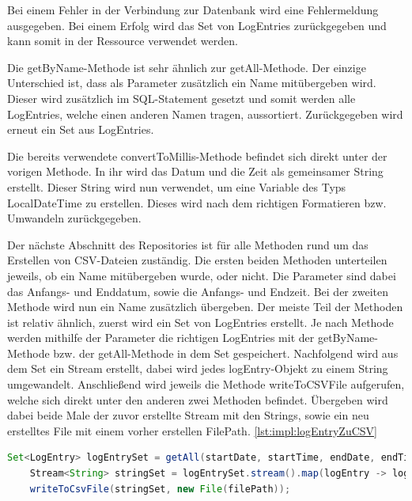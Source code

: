 Bei einem Fehler in der Verbindung zur Datenbank wird eine Fehlermeldung ausgegeben. Bei einem Erfolg wird das Set von LogEntries zurückgegeben und kann somit in der Ressource verwendet werden.
 
Die getByName-Methode ist sehr ähnlich zur getAll-Methode. Der einzige Unterschied ist, dass als Parameter zusätzlich ein Name mitübergeben wird. Dieser wird zusätzlich im SQL-Statement gesetzt und somit werden alle LogEntries, welche einen anderen Namen tragen, aussortiert. Zurückgegeben wird erneut ein Set aus LogEntries.
 
Die bereits verwendete convertToMillis-Methode befindet sich direkt unter der vorigen Methode. In ihr wird das Datum und die Zeit als gemeinsamer String erstellt. Dieser String wird nun verwendet, um eine Variable des Typs LocalDateTime zu erstellen. Dieses wird nach dem richtigen Formatieren bzw. Umwandeln zurückgegeben.
 
Der nächste Abschnitt des Repositories ist für alle Methoden rund um das Erstellen von CSV-Dateien zuständig. Die ersten beiden Methoden unterteilen jeweils, ob ein Name mitübergeben wurde, oder nicht. Die Parameter sind dabei das Anfangs- und Enddatum, sowie die Anfangs- und Endzeit. Bei der zweiten Methode wird nun ein Name zusätzlich übergeben. Der meiste Teil der Methoden ist relativ ähnlich, zuerst wird ein Set von LogEntries erstellt. Je nach Methode werden mithilfe der Parameter die richtigen LogEntries mit der getByName-Methode bzw. der getAll-Methode in dem Set gespeichert. Nachfolgend wird aus dem Set ein Stream erstellt, dabei wird jedes logEntry-Objekt zu einem String umgewandelt. Anschließend wird jeweils die Methode writeToCSVFile aufgerufen, welche sich direkt unter den anderen zwei Methoden befindet. Übergeben wird dabei beide Male der zuvor erstellte Stream mit den Strings, sowie ein neu erstelltes File mit einem vorher erstellen FilePath. \ref{lst:impl:logEntryZuCSV}

\begin{lstlisting}[language=java,caption=LogEntrySet zu CSV umwandeln,label=lst:impl:logEntryZuCSV]
    Set<LogEntry> logEntrySet = getAll(startDate, startTime, endDate, endTime);
    Stream<String> stringSet = logEntrySet.stream().map(logEntry -> logEntry.toString());
    writeToCsvFile(stringSet, new File(filePath));
\end{lstlisting}

